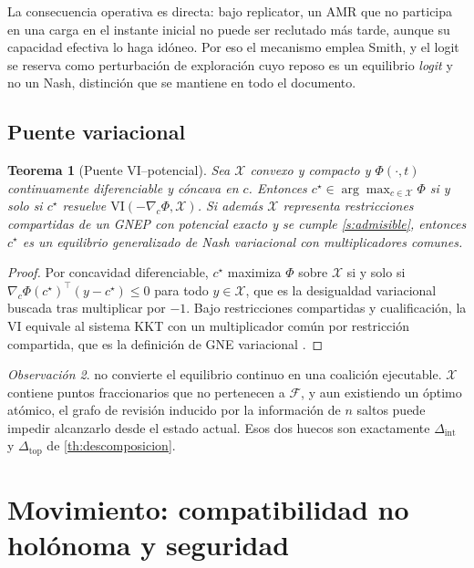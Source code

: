 \documentclass[11pt,a4paper]{article}
\theoremstyle{plain}
\newtheorem{teorema}{Teorema}[section]
\theoremstyle{definition}
\theoremstyle{remark}
\newtheorem{observacion}[teorema]{Observación}
\newcommand{\Xcal}{\mathcal{X}}
\newcommand{\Fcal}{\mathcal{F}}
\newcommand{\T}{^{\!\top}}
\begin{document}
La consecuencia operativa es directa: bajo replicator, un AMR que no participa
en una carga en el instante inicial no puede ser reclutado más tarde, aunque su
capacidad efectiva lo haga idóneo. Por eso el mecanismo emplea Smith, y el
logit se reserva como perturbación de exploración cuyo reposo es un equilibrio
\emph{logit} y no un Nash, distinción que se mantiene en todo el documento.

\subsection{Puente variacional}

\begin{teorema}[Puente VI--potencial]
\label{th:vi}
Sea $\Xcal$ convexo y compacto y $\Phi(\cdot,t)$ continuamente diferenciable y
cóncava en $c$. Entonces $c^\star\in\arg\max_{c\in\Xcal}\Phi$ si y solo si
$c^\star$ resuelve $\mathrm{VI}(-\nabla_c\Phi,\Xcal)$. Si además $\Xcal$
representa restricciones compartidas de un GNEP con potencial exacto y se
cumple \cref{s:admisible}, entonces $c^\star$ es un equilibrio generalizado de
Nash variacional con multiplicadores comunes.
\end{teorema}

\begin{proof}
Por concavidad diferenciable, $c^\star$ maximiza $\Phi$ sobre $\Xcal$ si y solo
si $\nabla_c\Phi(c^\star)\T(y-c^\star)\le0$ para todo $y\in\Xcal$, que es la
desigualdad variacional buscada tras multiplicar por $-1$. Bajo restricciones
compartidas y cualificación, la VI equivale al sistema KKT con un multiplicador
común por restricción compartida, que es la definición de GNE variacional
\cite{facchinei2007gne}.
\end{proof}

\begin{observacion}
\label{obs:vi}
 no convierte el equilibrio continuo en una coalición ejecutable.
$\Xcal$ contiene puntos fraccionarios que no pertenecen a $\Fcal$, y aun
existiendo un óptimo atómico, el grafo de revisión inducido por la información
de $n$ saltos puede impedir alcanzarlo desde el estado actual. Esos dos huecos
son exactamente $\Delta_{\mathrm{int}}$ y $\Delta_{\mathrm{top}}$ de
\cref{th:descomposicion}.
\end{observacion}


\section{Movimiento: compatibilidad no holónoma y seguridad}
\label{sec:movimiento}
\end{document}
